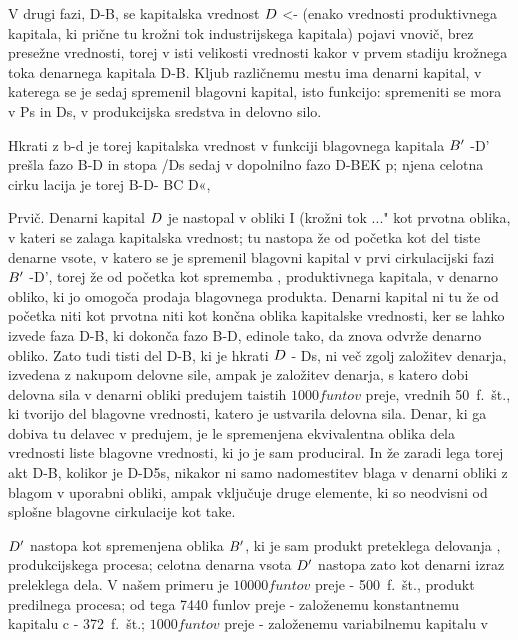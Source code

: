 \documentclass[kapital_02.tex]{subfiles}
\begin{document}
V drugi fazi, D-B, se kapitalska vrednost \( D \) <- \KPEP (enako vrednosti produktivnega kapitala, ki prične tu krožni tok industrijskega kapitala) pojavi vnovič, brez presežne vrednosti, torej v isti velikosti vrednosti kakor v prvem stadiju krožnega toka denarnega kapitala D-B. Kljub različnemu mestu ima denarni kapital, v katerega se je sedaj spremenil blagovni kapital, isto funkcijo: spremeniti se mora v Ps in Ds, v produkcijska sredstva in delovno silo.

Hkrati z b-d je torej kapitalska vrednost v funkciji blagovnega kapitala \( B' \) -D' prešla fazo B-D in stopa /Ds sedaj v dopolnilno fazo D-BEK p; njena celotna cirku lacija je torej B-D- BC D«,

Prvič. Denarni kapital \( D \) je nastopal v obliki I (krožni tok \KPED...\KPED" kot prvotna oblika, v kateri se zalaga kapitalska vrednost; tu nastopa že od početka kot del tiste denarne vsote, v katero se je spremenil blagovni kapital v prvi cirkulacijski fazi \( B' \) -D', torej že od početka kot sprememba \KPEP, produktivnega kapitala, v denarno obliko, ki jo omogoča prodaja blagovnega produkta. Denarni kapital ni tu že od početka niti kot prvotna niti kot končna oblika kapitalske vrednosti, ker se lahko izvede faza D-B, ki dokonča fazo B-D, edinole tako, da znova odvrže denarno obliko. Zato tudi tisti del D-B, ki je hkrati \( D \) - Ds, ni več zgolj založitev denarja, izvedena z nakupom delovne sile, ampak je založitev denarja, s katero dobi delovna sila v denarni obliki predujem taistih \( 1000 funtov \) preje, vrednih 50~f.~št., ki tvorijo del blagovne vrednosti, katero je ustvarila delovna sila. Denar, ki ga dobiva tu delavec v predujem, je le spremenjena ekvivalentna oblika dela vrednosti liste blagovne vrednosti, ki jo je sam produciral. In že zaradi lega torej akt D-B, kolikor je D-D5s, nikakor ni samo nadomestitev blaga v denarni obliki z blagom v uporabni obliki, ampak vključuje druge elemente, ki so neodvisni od splošne blagovne cirkulacije kot take.

\( D' \) nastopa kot spremenjena oblika \( B' \), ki je sam produkt preteklega delovanja \KPEP, produkcijskega procesa; celotna denarna vsota \( D' \) nastopa zato kot denarni izraz preleklega dela. V našem primeru je \( 10000 funtov \) preje - 500~f.~št., produkt predilnega procesa; od tega 7440 funlov preje - založenemu konstantnemu kapitalu c - 372~f.~št.; \( 1000 funtov \) preje - založenemu variabilnemu kapitalu v
\end{document}
